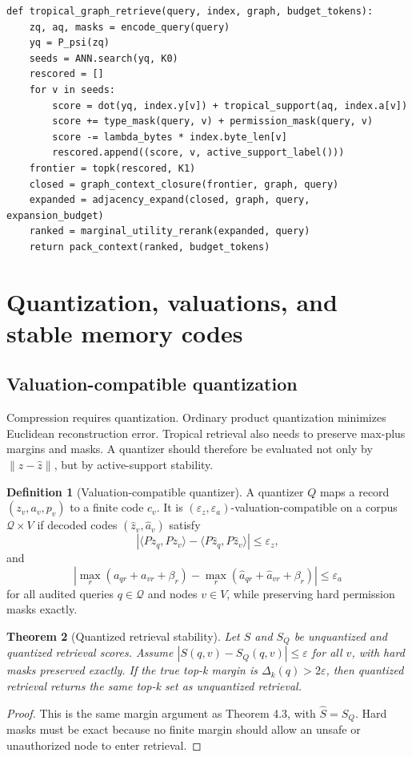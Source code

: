 \documentclass[11pt]{article}
\newtheorem{theorem}{Theorem}[section]
\theoremstyle{definition}
\newtheorem{definition}[theorem]{Definition}
\theoremstyle{remark}
\newcommand{\eps}{\varepsilon}
\begin{document}
\begin{Verbatim}[fontsize=\small,frame=single]
def tropical_graph_retrieve(query, index, graph, budget_tokens):
    zq, aq, masks = encode_query(query)
    yq = P_psi(zq)
    seeds = ANN.search(yq, K0)
    rescored = []
    for v in seeds:
        score = dot(yq, index.y[v]) + tropical_support(aq, index.a[v])
        score += type_mask(query, v) + permission_mask(query, v)
        score -= lambda_bytes * index.byte_len[v]
        rescored.append((score, v, active_support_label()))
    frontier = topk(rescored, K1)
    closed = graph_context_closure(frontier, graph, query)
    expanded = adjacency_expand(closed, graph, query, expansion_budget)
    ranked = marginal_utility_rerank(expanded, query)
    return pack_context(ranked, budget_tokens)
\end{Verbatim}

\section{Quantization, valuations, and stable memory codes}

\subsection{Valuation-compatible quantization}

Compression requires quantization. Ordinary product quantization minimizes Euclidean reconstruction error. Tropical retrieval also needs to preserve max-plus margins and masks. A quantizer should therefore be evaluated not only by \(\|z-\hat z\|\), but by active-support stability.

\begin{definition}[Valuation-compatible quantizer]
A quantizer \(Q\) maps a record \((z_v,a_v,p_v)\) to a finite code \(c_v\). It is \((\eps_z,\eps_a)\)-valuation-compatible on a corpus \(\mathcal Q\times V\) if decoded codes \((\hat z_v,\hat a_v)\) satisfy
\[
    |\langle Pz_q,Pz_v\rangle-\langle P\hat z_q,P\hat z_v\rangle|\le \eps_z,
\]
and
\[
    \left|\max_r(a_{qr}+a_{vr}+\beta_r)-\max_r(\hat a_{qr}+\hat a_{vr}+\beta_r)\right|\le \eps_a
\]
for all audited queries \(q\in\mathcal Q\) and nodes \(v\in V\), while preserving hard permission masks exactly.
\end{definition}

\begin{theorem}[Quantized retrieval stability]
Let \(S\) and \(S_Q\) be unquantized and quantized retrieval scores. Assume \(|S(q,v)-S_Q(q,v)|\le \eps\) for all \(v\), with hard masks preserved exactly. If the true top-k margin is \(\Delta_k(q)>2\eps\), then quantized retrieval returns the same top-k set as unquantized retrieval.
\end{theorem}
\begin{proof}
This is the same margin argument as Theorem 4.3, with \(\widehat S=S_Q\). Hard masks must be exact because no finite margin should allow an unsafe or unauthorized node to enter retrieval.
\end{proof}
\end{document}
